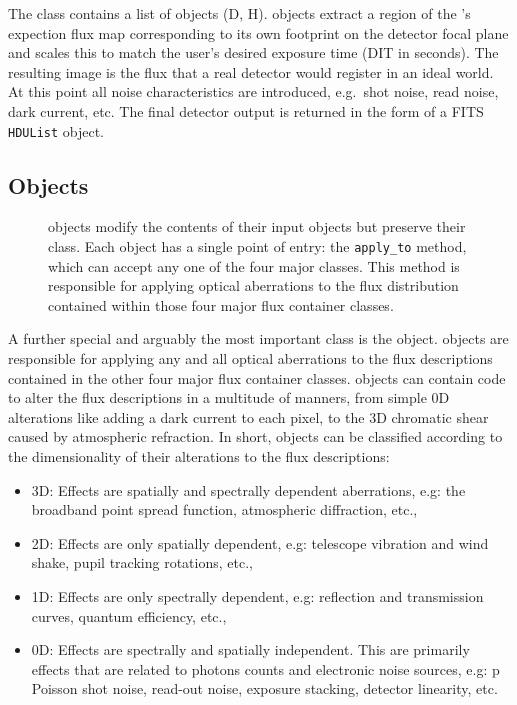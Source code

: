 The \DetectorArray{} class contains a list of \Detector{} objects (D, H).
\Detector{} objects extract a region of the \ImagePlane{}'s expection flux map corresponding to its own footprint on the detector focal plane and scales this to match the user's desired exposure time (DIT in seconds).
The resulting image is the flux that a real detector would register in an ideal world.
At this point all noise characteristics are introduced, e.g.~shot noise, read noise, dark current, etc.
The final detector output is returned in the form of a FITS \lstinline{HDUList} object.


\subsection{\Effect{} Objects}
\label{effects-objects}

\begin{figure}

\caption{\Effect{} objects modify the contents of their input objects but preserve their class.
Each \Effect{} object has a single point of entry: the \lstinline{apply_to} method, which can accept any one of the four major \ScopeSim{} classes.
This method is responsible for applying optical aberrations to the flux distribution contained within those four major flux container classes.}
\label{fig:effect}

\end{figure}

A further special and arguably the most important \ScopeSim{} class is the \Effect{} object.
\Effect{} objects are responsible for applying any and all optical aberrations to the flux descriptions contained in the other four major flux container classes.
\Effect{} objects can contain code to alter the flux descriptions in a multitude of manners, from simple 0D alterations like adding a dark current to each pixel, to the 3D chromatic shear caused by atmospheric refraction.
In short, \Effect{} objects can be classified according to the dimensionality of their alterations to the flux descriptions:

\begin{itemize}
\item 3D: Effects are spatially and spectrally dependent aberrations, e.g: the broadband point spread function, atmospheric diffraction, etc.,

\item 2D: Effects are only spatially dependent, e.g: telescope vibration and wind shake, pupil tracking rotations, etc.,

\item 1D: Effects are only spectrally dependent, e.g: reflection and transmission curves, quantum efficiency, etc.,

\item 0D: Effects are spectrally and spatially independent. This are primarily effects that are related to photons counts and electronic noise sources, e.g: p
Poisson shot noise, read-out noise, exposure stacking, detector linearity, etc.
\end{itemize}

